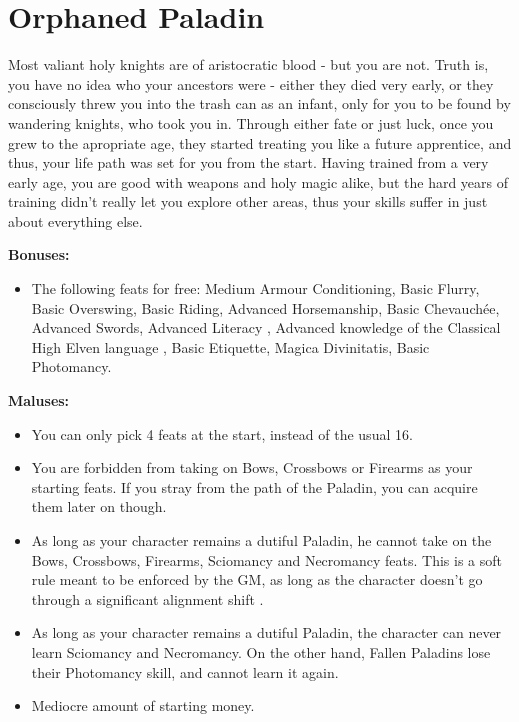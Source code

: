 \section{Orphaned Paladin}
Most valiant holy knights are of aristocratic blood - but you are not. Truth is, you have no idea who your ancestors were - either they died very early, or they consciously threw you into the trash can as an infant, only for you to be found by wandering knights, who took you in. Through either fate or just luck, once you grew to the apropriate age, they started treating you like a future apprentice, and thus, your life path was set for you from the start. Having trained from a very early age, you are good with weapons and holy magic alike, but the hard years of training didn't really let you explore other areas, thus your skills suffer in just about everything else.


\textbf{Bonuses:}
\begin{itemize}
	\item The following feats for free: Medium Armour Conditioning, Basic Flurry, Basic Overswing, Basic Riding, Advanced Horsemanship, Basic Chevauchée, Advanced Swords, Advanced Literacy , Advanced knowledge of the Classical High Elven language , Basic Etiquette, Magica Divinitatis, Basic Photomancy.
\end{itemize}
\textbf{Maluses:}
\begin{itemize}
	\item You can only pick 4 feats at the start, instead of the usual 16.
	\item You are forbidden from taking on Bows, Crossbows or Firearms as your starting feats. If you stray from the path of the Paladin, you can acquire them later on though.
	\item As long as your character remains a dutiful Paladin, he cannot take on the Bows, Crossbows, Firearms, Sciomancy and Necromancy feats. This is a soft rule meant to be enforced by the GM, as long as the character doesn't go through a significant alignment shift .
	\item As long as your character remains a dutiful Paladin, the character can never learn Sciomancy and Necromancy. On the other hand, Fallen Paladins lose their Photomancy skill, and cannot learn it again.
	\item Mediocre amount of starting money.
\end{itemize}

